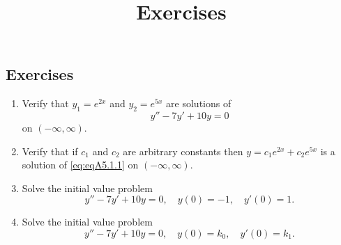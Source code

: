 \documentclass{ximera}
\title{Exercises} \license{CC BY-NC-SA 4.0}
\begin{document}
\begin{abstract}
\end{abstract}
\maketitle

\begin{onlineOnly}
\section*{Exercises}
\end{onlineOnly}


\begin{problem}\label{exer:5.1.1}

\begin{enumerate}
\item %
Verify that $y_1=e^{2x}$ and $y_2=e^{5x}$ are solutions of
\begin{equation}\label{eq:eqA5.1.1}
    y''-7y'+10y=0
\end{equation}
on  $(-\infty,\infty)$.
\item %
Verify that if $c_1$ and $c_2$ are arbitrary constants then
$y=c_1e^{2x}+c_2e^{5x}$ is a solution of \ref{eq:eqA5.1.1} on
$(-\infty,\infty)$.
\item %
Solve the initial value problem
$$
y''-7y'+10y=0,\quad  y(0)=-1,\quad y'(0)=1.
$$
\item %
Solve the initial value problem
$$
y''-7y'+10y=0,\quad  y(0)=k_0,\quad y'(0)=k_1.
$$
\end{enumerate}
\end{problem}
\end{document}
